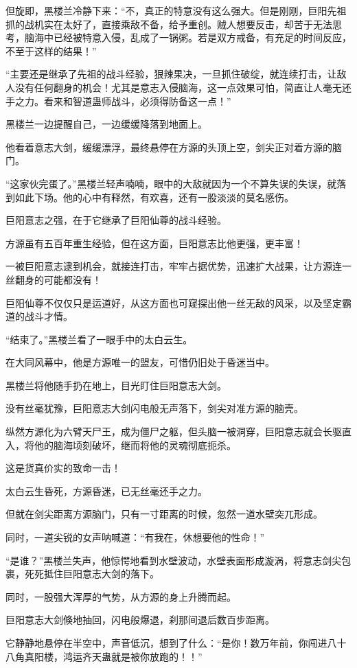 \begin{this_body}
但旋即，黑楼兰冷静下来：“不，真正的特意没有这么强大。但是刚刚，巨阳先祖抓的战机实在太好了，直接乘敌不备，给予重创。贼人想要反击，却苦于无法思考，脑海中已经被特意入侵，乱成了一锅粥。若是双方戒备，有充足的时间反应，不至于这样的结果！”

“主要还是继承了先祖的战斗经验，狠辣果决，一旦抓住破绽，就连续打击，让敌人没有任何翻身的机会！尤其是意志入侵脑海，这一点效果可怕，简直让人毫无还手之力。看来和智道蛊师战斗，必须得防备这一点！”

黑楼兰一边提醒自己，一边缓缓降落到地面上。

他看着意志大剑，缓缓漂浮，最终悬停在方源的头顶上空，剑尖正对着方源的脑门。

“这家伙完蛋了。”黑楼兰轻声喃喃，眼中的大敌就因为一个不算失误的失误，就落到如此下场。他的心中有释然，有欢喜，还有一股淡淡的莫名感伤。

巨阳意志之强，在于它继承了巨阳仙尊的战斗经验。

方源虽有五百年重生经验，但在这方面，巨阳意志比他更强，更丰富！

一被巨阳意志逮到机会，就接连打击，牢牢占据优势，迅速扩大战果，让方源连一丝翻身的可能都没有！

巨阳仙尊不仅仅只是运道好，从这方面也可窥探出他一丝无敌的风采，以及坚定霸道的战斗才情。

“结束了。”黑楼兰看了一眼手中的太白云生。

在大同风幕中，他是方源唯一的盟友，可惜仍旧处于昏迷当中。

黑楼兰将他随手扔在地上，目光盯住巨阳意志大剑。

没有丝毫犹豫，巨阳意志大剑闪电般无声落下，剑尖对准方源的脑壳。

纵然方源化为六臂天尸王，成为僵尸之躯，但头脑一被洞穿，巨阳意志就会长驱直入，将他的脑海顷刻破坏，继而将他的灵魂彻底扼杀。

这是货真价实的致命一击！

太白云生昏死，方源昏迷，已无丝毫还手之力。

但就在剑尖距离方源脑门，只有一寸距离的时候，忽然一道水壁突兀形成。

同时，一道尖锐的女声呐喊道：“有我在，休想要他的性命！”

“是谁？”黑楼兰失声，他惊愕地看到水壁波动，水壁表面形成漩涡，将意志剑尖包裹，死死抵住巨阳意志大剑的落下。

同时，一股强大浑厚的气势，从方源的身上升腾而起。

巨阳意志大剑倏地抽回，闪电般爆退，刹那间退后数百步距离。

它静静地悬停在半空中，声音低沉，想到了什么：“是你！数万年前，你闯进八十八角真阳楼，鸿运齐天蛊就是被你放跑的！！”


\end{this_body}
